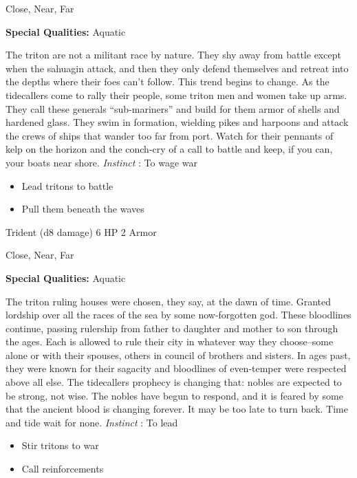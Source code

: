  Close, Near, Far


 \textbf{Special Qualities:}
 Aquatic


 The triton are not a militant race by nature. They shy away from battle except when the sahuagin attack, and then they only defend themselves and retreat into the depths where their foes can't follow. This trend begins to change. As the tidecallers come to rally their people, some triton men and women take up arms. They call these generals ``sub-mariners'' and build for them armor of shells and hardened glass. They swim in formation, wielding pikes and harpoons and attack the crews of ships that wander too far from port. Watch for their pennants of kelp on the horizon and the conch-cry of a call to battle and keep, if you can, your boats near shore. \emph{Instinct}
: To wage war
\begin{itemize}
\item Lead tritons to battle
\item Pull them beneath the waves

\end{itemize}




 Trident (d8 damage) 6 HP 2 Armor


 Close, Near, Far


 \textbf{Special Qualities:}
 Aquatic


 The triton ruling houses were chosen, they say, at the dawn of time. Granted lordship over all the races of the sea by some now-forgotten god. These bloodlines continue, passing rulership from father to daughter and mother to son through the ages. Each is allowed to rule their city in whatever way they choose--some alone or with their spouses, others in council of brothers and sisters. In ages past, they were known for their sagacity and bloodlines of even-temper were respected above all else. The tidecallers prophecy is changing that: nobles are expected to be strong, not wise. The nobles have begun to respond, and it is feared by some that the ancient blood is changing forever. It may be too late to turn back. Time and tide wait for none. \emph{Instinct}
: To lead
\begin{itemize}
\item Stir tritons to war
\item Call reinforcements

\end{itemize}


